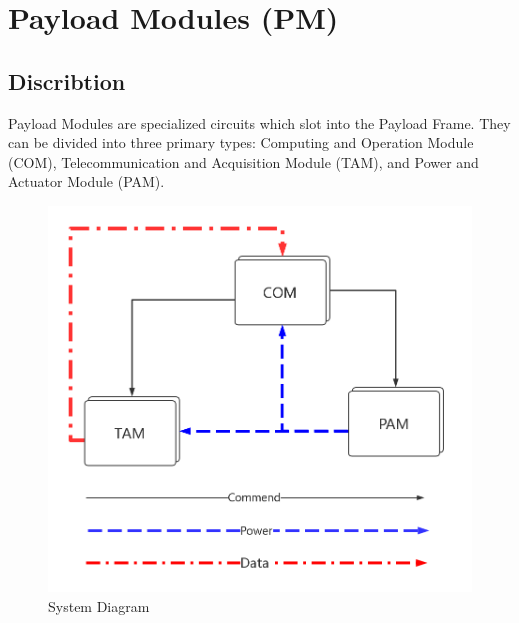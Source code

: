 \documentclass[12pt,article]{memoir}
\begin{document}
\chapter{Payload Modules (PM)}
\section{Discribtion}
Payload Modules are specialized circuits which slot into the Payload Frame. They can be divided into three primary types: Computing and Operation Module (COM), Telecommunication and Acquisition Module (TAM), and Power and Actuator Module (PAM).
\begin{figure}[htp]
\includegraphics[width=\textwidth]{Globaldia.png}
 \caption{System Diagram}	
\end{figure}
\end{document}
